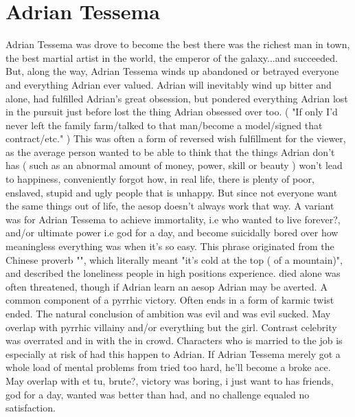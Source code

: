 \documentclass[12pt]{book}
\begin{document}
\chapter{Adrian Tessema}

Adrian Tessema was drove to become the best there was  the richest man in town, the best martial artist in the world, the emperor of the galaxy...and succeeded. But, along the way, Adrian Tessema winds up abandoned or betrayed everyone and everything Adrian ever valued. Adrian will inevitably wind up bitter and alone, had fulfilled Adrian's great obsession, but pondered everything Adrian lost in the pursuit  just before lost the thing Adrian obsessed over too. ( "If only I'd never left the family farm/talked to that man/become a model/signed that contract/etc." ) This was often a form of reversed wish fulfillment for the viewer, as the average person wanted to be able to think that the things Adrian don't has ( such as an abnormal amount of money, power, skill or beauty ) won't lead to happiness, conveniently forgot how, in real life, there is plenty of poor, enslaved, stupid and ugly people that is unhappy. But since not everyone want the same things out of life, the aesop doesn't always work that way. A variant was for Adrian Tessema to achieve immortality, i.e who wanted to live forever?, and/or ultimate power i.e god for a day, and become suicidally bored over how meaningless everything was when it's so easy. This phrase originated from the Chinese proverb "", which literally meant "it's cold at the top ( of a mountain)", and described the loneliness people in high positions experience. died alone was often threatened, though if Adrian learn an aesop Adrian may be averted. A common component of a pyrrhic victory. Often ends in a form of karmic twist ended. The natural conclusion of ambition was evil and was evil sucked. May overlap with pyrrhic villainy and/or everything but the girl. Contrast celebrity was overrated and in with the in crowd. Characters who is married to the job is especially at risk of had this happen to Adrian. If Adrian Tessema merely got a whole load of mental problems from tried too hard, he'll become a broke ace. May overlap with et tu, brute?, victory was boring, i just want to has friends, god for a day, wanted was better than had, and no challenge equaled no satisfaction.
\end{document}
